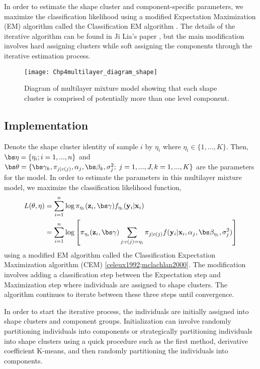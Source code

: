 In order to estimate the shape cluster and component-specific parameters, we maximize the classification likelihood using a modified Expectation Maximization (EM) algorithm \cite{dempster1977} called the Classification EM algorithm \cite{mclachlan2000}. The details of the iterative algorithm can be found in Ji Lia's paper \cite{li2005}, but the main modification involves hard assigning clusters while soft assigning the components through the iterative estimation process.
\begin{figure}[h]
\begin{center}
\texttt{[image: Chp4multilayer\_diagram\_shape]}
\end{center}
\label{fig:diashape}
\caption{Diagram of multilayer mixture model showing that each shape cluster is comprised of potentially more than one level component.}
\end{figure}
\subsection{Implementation}
Denote the shape cluster identity of sample $i$ by $\eta_{i}$ where $\eta_{i}\in\{1,...,K\}$. Then, $\bs\eta = \{\eta_{i}; i=1,...,n\}$ and $\bs\theta=\{\bs \gamma_{k}, \pi_{j|c(j)},\alpha_{j}, \bs\beta_{k},\sigma^{2}_{j};\; j=1,...,J, k=1,...,K\}$ are the parameters for the model. In order to estimate the parameters in this multilayer mixture model, we maximize the classification likelihood function, \cite{mclachlan2000}
\begin{align}
 L(\theta,\eta) &= \sum^{n}_{i=1} \log \pi_{\eta_{i}}(\B z_{i},\bs\gamma) f_{\eta_{i}}(\B y_{i}|\B x_{i})\\
\label{ll}& =  \sum^{n}_{i=1} \log\left[ \pi_{\eta_{i}}(\B z_{i},\bs\gamma)  \sum_{j: c(j) = \eta_{i}} \pi_{j|c(j)}f(\B y_{i}|\B x_{i},\alpha_{j},\bs\beta_{\eta_{i}},\sigma^{2}_{j})\right]
\end{align} 
using a modified EM algorithm called the Classification Expectation Maximization algorithm (CEM) \ref{celeux1992;mclachlan2000}. The modification involves adding a classification step between the Expectation step and Maximization step where individuals are assigned to shape clusters. The algorithm continues to iterate between these three steps until convergence.

In order to start the iterative process, the individuals are initially assigned into shape clusters and component groups. Initialization can involve randomly partitioning individuals into components or strategically partitioning individuals into shape clusters using a quick procedure such as the first method, derivative coefficient K-means, and then randomly partitioning the individuals into components. 

